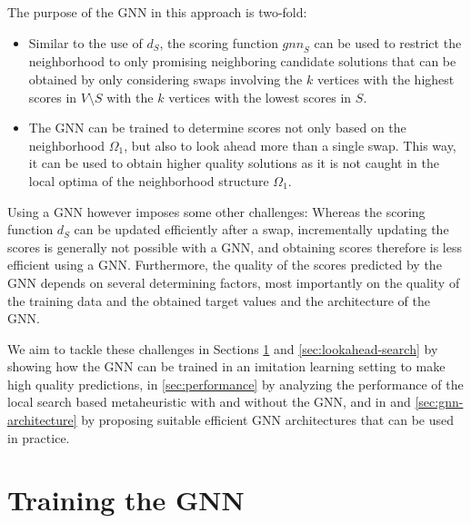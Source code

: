 \documentclass[draft,final]{vutinfth} %
\begin{document}
The purpose of the GNN in this approach is two-fold: 
\begin{itemize}
    \item Similar to the use of $d_S$, the scoring function $\mathit{gnn}_S$ can be used to restrict the neighborhood to only promising neighboring candidate solutions that can be obtained by only considering swaps involving the $k$ vertices with the highest scores in $V \setminus S$ with the $k$ vertices with the lowest scores in $S$. 
    \item The GNN can be trained to determine scores not only based on the neighborhood $\Omega_1$, but also to look ahead more than a single swap. This way, it can be used to obtain higher quality solutions as it is not caught in the local optima of the neighborhood structure $\Omega_1$.
\end{itemize}

Using a GNN however imposes some other challenges: 
Whereas the scoring function $d_S$ can be updated efficiently after a swap, incrementally updating the scores is generally not possible with a GNN, and obtaining scores therefore is less efficient using a GNN. 
Furthermore, the quality of the scores predicted by the GNN depends on several determining factors, most importantly on the quality of the training data and the obtained target values and the architecture of the GNN. 

We aim to tackle these challenges in Sections \ref{sec:gnn-training} and \ref{sec:lookahead-search} by showing how the GNN can be trained in an imitation learning setting to make high quality predictions, in \ref{sec:performance} by analyzing the performance of the local search based metaheuristic with and without the GNN, and in and \ref{sec:gnn-architecture} by proposing suitable efficient GNN architectures that can be used in practice. 

\section{Training the GNN}\label{sec:gnn-training}
\end{document}
